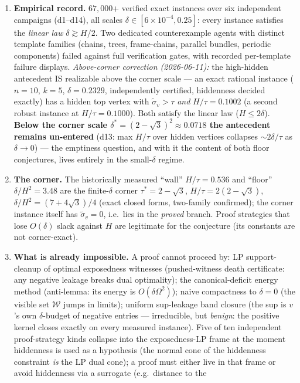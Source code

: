 \documentclass[11pt]{article}
\theoremstyle{plain}
\theoremstyle{definition}
\theoremstyle{remark}
\newcommand{\W}{\mathcal W}
\newcommand{\sigt}{\widetilde{\sigma}}
\begin{document}
\begin{enumerate}
\item \textbf{Empirical record.} $67{,}000$+ verified exact instances over six
independent campaigns (d1--d14), all scales $\delta\in[6\times10^{-4},0.25]$: every
instance satisfies the \emph{linear law} $\delta\gtrsim H/2$. Two dedicated
counterexample agents with distinct template families (chains, trees, frame-chains,
parallel bundles, periodic components) failed against full verification gates, with
recorded per-template failure displays. \emph{Above-corner correction (2026-06-11):}
the high-hidden antecedent IS realizable above the corner scale --- an exact rational
instance ($n=10$, $k=5$, $\delta=0.2329$, independently certified, hiddenness decided
exactly) has a hidden top vertex with $\sigt_v>\tau$ \emph{and} $H/\tau=0.1002$ (a
second robust instance at $H/\tau=0.1000$). Both satisfy the linear law ($H\le2\delta$).
\textbf{Below the corner scale $\delta^*=(2-\sqrt3)^2\approx0.0718$ the antecedent
remains un-entered} (d13: max $H/\tau$ over hidden vertices collapses $\sim2\delta/\tau$
as $\delta\to0$) --- the emptiness question, and with it the content of both floor
conjectures, lives entirely in the small-$\delta$ regime.
\item \textbf{The corner.} The historically measured ``wall'' $H/\tau=0.536$ and
``floor'' $\delta/H^2=3.48$ are the finite-$\delta$ corner $\tau^*=2-\sqrt3$,
$H/\tau=2(2-\sqrt3)$, $\delta/H^2=(7+4\sqrt3)/4$ (exact closed forms, two-family
confirmed); the corner instance itself has $\sigt_v=0$, i.e.\ lies in the
\emph{proved} branch. Proof strategies that lose $O(\delta)$ slack against $H$ are
legitimate for the conjecture (its constants are not corner-exact).
\item \textbf{What is already impossible.} A proof cannot proceed by: LP support-cleanup
of optimal exposedness witnesses (pushed-witness death certificate: any negative leakage
breaks dual optimality); the canonical-deficit energy method (anti-lemma: its energy is
$O(\delta\Omega^2)$); naive compactness to $\delta=0$ (the visible set $\W$ jumps in
limits); uniform sup-leakage band closure (the sup is $v$'s own $\delta$-budget of
negative entries --- irreducible, but \emph{benign}: the positive kernel closes exactly
on every measured instance). Five of ten independent proof-strategy kinds collapse into
the exposedness-LP frame at the moment hiddenness is used as a hypothesis (the normal
cone of the hiddenness constraint \emph{is} the LP dual cone); a proof must either live
in that frame or avoid hiddenness via a surrogate (e.g.\ distance to the

\end{enumerate}
\end{document}

